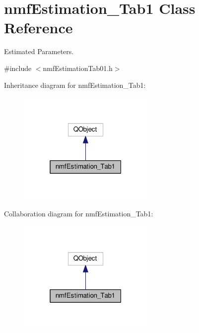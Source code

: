 \hypertarget{classnmf_estimation___tab1}{}\section{nmf\+Estimation\+\_\+\+Tab1 Class Reference}
\label{classnmf_estimation___tab1}


Estimated Parameters.  




{\ttfamily \#include $<$nmf\+Estimation\+Tab01.\+h$>$}



Inheritance diagram for nmf\+Estimation\+\_\+\+Tab1\+:\nopagebreak
\begin{figure}[H]
\begin{center}
\leavevmode
\includegraphics[width=187pt]{classnmf_estimation___tab1__inherit__graph}
\end{center}
\end{figure}


Collaboration diagram for nmf\+Estimation\+\_\+\+Tab1\+:\nopagebreak
\begin{figure}[H]
\begin{center}
\leavevmode
\includegraphics[width=187pt]{classnmf_estimation___tab1__coll__graph}
\end{center}
\end{figure}
